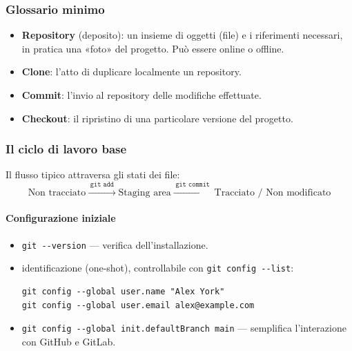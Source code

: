 \documentclass[a4paper,12pt]{article}
\begin{document}
\subsubsection{Glossario minimo}

\begin{itemize}
  \item \textbf{Repository} (deposito): un insieme di oggetti (file) e i riferimenti
        necessari, in pratica una «foto» del progetto. Può essere online o offline.
  \item \textbf{Clone}: l'atto di duplicare localmente un repository.
  \item \textbf{Commit}: l'invio al repository delle modifiche effettuate.
  \item \textbf{Checkout}: il ripristino di una particolare versione del progetto.
\end{itemize}

\subsubsection{Il ciclo di lavoro base}

Il flusso tipico attraversa gli stati dei file:
\[
\text{Non tracciato} \xrightarrow{\;\texttt{git add}\;} \text{Staging area}
\xrightarrow{\;\texttt{git commit}\;} \text{Tracciato / Non modificato}
\]

\paragraph{Configurazione iniziale}
\begin{itemize}
  \item \verb|git --version| --- verifica dell'installazione.
  \item identificazione (one-shot), controllabile con \verb|git config --list|:
\begin{verbatim}
git config --global user.name "Alex York"
git config --global user.email alex@example.com
\end{verbatim}
  \item \verb|git config --global init.defaultBranch main| --- semplifica l'interazione
        con GitHub e GitLab.
\end{itemize}
\end{document}
